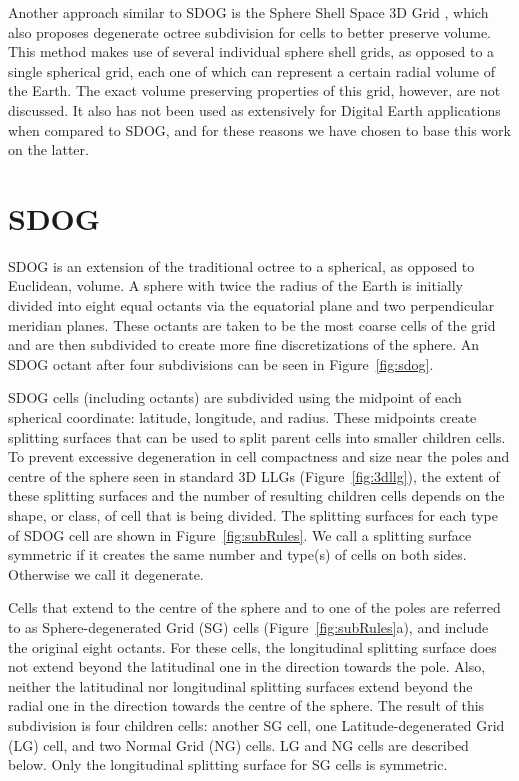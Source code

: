 Another approach similar to SDOG is the Sphere Shell Space 3D Grid \cite{gang2013sphere}, which also proposes degenerate octree subdivision for cells to better preserve volume. This method makes use of several individual sphere shell grids, as opposed to a single spherical grid, each one of which can represent a certain radial volume of the Earth. The exact volume preserving properties of this grid, however, are not discussed. It also has not been used as extensively for Digital Earth applications when compared to SDOG, and for these reasons we have chosen to base this work on the latter.


\section{SDOG} \label{sec:sdog}
SDOG is an extension of the traditional octree to a spherical, as opposed to Euclidean, volume. A sphere with twice the radius of the Earth is initially divided into eight equal octants via the equatorial plane and two perpendicular meridian planes. These octants are taken to be the most coarse cells of the grid and are then subdivided to create more fine discretizations of the sphere. An SDOG octant after four subdivisions can be seen in Figure~\ref{fig:sdog}.



SDOG cells (including octants) are subdivided using the midpoint of each spherical coordinate: latitude, longitude, and radius. These midpoints create splitting surfaces that can be used to split parent cells into smaller children cells. To prevent excessive degeneration in cell compactness and size near the poles and centre of the sphere seen in standard 3D LLGs (Figure~\ref{fig:3dllg}), the extent of these splitting surfaces and the number of resulting children cells depends on the shape, or class, of cell that is being divided. The splitting surfaces for each type of SDOG cell are shown in Figure~\ref{fig:subRules}. We call a splitting surface symmetric if it creates the same number and type(s) of cells on both sides. Otherwise we call it degenerate.

Cells that extend to the centre of the sphere and to one of the poles are referred to as Sphere-degenerated Grid (SG) cells (Figure~\ref{fig:subRules}a), and include the original eight octants. For these cells, the longitudinal splitting surface does not extend beyond the latitudinal one in the direction towards the pole. Also, neither the latitudinal nor longitudinal splitting surfaces extend beyond the radial one in the direction towards the centre of the sphere. The result of this subdivision is four children cells: another SG cell, one Latitude-degenerated Grid (LG) cell, and two Normal Grid (NG) cells. LG and NG cells are described below. Only the longitudinal splitting surface for SG cells is symmetric.


